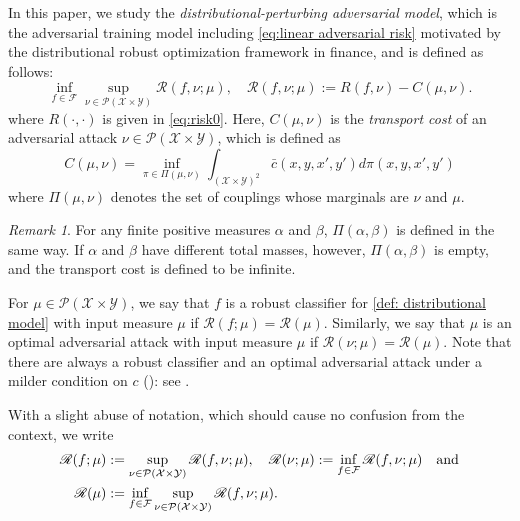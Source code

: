 \documentclass{amsart}
\theoremstyle{plain}
\numberwithin{equation}{section}\newtheorem{theorem}{Theorem}[section]
\theoremstyle{remark}
\newtheorem{remark}[theorem]{Remark}
\begin{document}
In this paper, we study the \emph{distributional-perturbing adversarial model}, which is the adversarial training model including \eqref{eq:linear adversarial risk} motivated by the distributional robust optimization framework in finance, and is defined as follows:
\begin{equation}\label{def: distributional model}
    \inf_{f\in \mathcal{F}} \sup_{\nu \in \mathcal{P}(\mathcal{X} \times \mathcal{Y})}\mathscr{R}(f,\nu; \mu), \quad  \mathscr{R}(f,\nu; \mu):= R(f,\nu) - C(\mu, \nu).
\end{equation}
where $R(\cdot, \cdot)$ is given in \eqref{eq:risk0}. Here, $C(\mu, \nu)$ is the \emph{transport cost} of an adversarial attack $\nu \in \mathcal{P}(\mathcal{X} \times \mathcal{Y})$, which is defined as
\begin{equation}\label{eq: general transport cost}
    C(\mu, \nu) = \inf_{\pi \in \Pi(\mu, \nu)} \int_{(\mathcal{X} \times \mathcal{Y})^2} \bar{c}( x,y, x',y' ) d\pi (x,y, x',y')
\end{equation}
where $\Pi(\mu, \nu)$ denotes the set of couplings whose marginals are $\nu$ and $\mu$. 




\begin{remark}
For any finite positive measures $\alpha$ and $\beta$, $\Pi(\alpha, \beta)$ is defined in the same way. If $\alpha$ and $\beta$ have different total masses, however, $\Pi(\alpha, \beta)$ is empty, and the transport cost is defined to be infinite. 
\end{remark}




For $\mu \in \mathcal{P}(\mathcal{X} \times \mathcal{Y})$, we say that $f$ is a robust classifier for \eqref{def: distributional model} with input measure $\mu$ if $\mathscr{R}(f; \mu) = \mathscr{R}( \mu)$. Similarly, we say that $\mu$ is an optimal adversarial attack with input measure $\mu$ if $\mathscr{R}(\nu; \mu) = \mathscr{R}( \mu)$. Note that there are always a robust classifier and an optimal adversarial attack under a milder condition on $c$ (): see \cite[Theorem 2.5]{jakwang_2024existence}. 




With a slight abuse of notation, which should cause no confusion from the context, we write
\begin{align*}
\begin{aligned}
    \mathscr{R}(f;\mu)&:= \sup_{\nu \in \mathcal{P}(\mathcal{X} \times \mathcal{Y})}\mathscr{R}(f,\nu; \mu), \quad \mathscr{R}(\nu ; \mu) := \inf_{f\in \mathcal{F}} \mathscr{R}(f,\nu; \mu) \quad \hbox{and}\\
    \mathscr{R}(\mu)&:= \inf_{f\in \mathcal{F}} \sup_{\nu \in \mathcal{P}(\mathcal{X} \times \mathcal{Y})}\mathscr{R}(f,\nu; \mu).
\end{aligned}
\label{def: rdist}
\end{align*}
\end{document}

